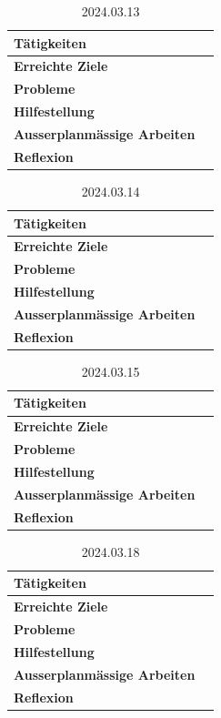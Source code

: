 \documentclass{report}
\begin{document}
\begin{table}[ht]
\caption{2024.03.13}
\begin{tabularx}{\textwidth}{|X|X|}
 \hline
 \textbf{Tätigkeiten} &   \\
 \hline
 \textbf{Erreichte Ziele} &   \\
  \hline
 \textbf{Probleme} &   \\
 \hline
 \textbf{Hilfestellung} &  \\
 \hline
 \textbf{Ausserplanmässige Arbeiten} &   \\
 \hline
 \textbf{Reflexion} &   \\
\hline
\end{tabularx}

\end{table}

\begin{table}[ht]
\caption{2024.03.14}
\begin{tabularx}{\textwidth}{|X|X|}
 \hline
 \textbf{Tätigkeiten} &   \\
 \hline
 \textbf{Erreichte Ziele} &   \\
  \hline
 \textbf{Probleme} &   \\
 \hline
 \textbf{Hilfestellung} &  \\
 \hline
 \textbf{Ausserplanmässige Arbeiten} &   \\
 \hline
 \textbf{Reflexion} &   \\
\hline
\end{tabularx}

\end{table}

\begin{table}[ht]
\caption{2024.03.15}
\begin{tabularx}{\textwidth}{|X|X|}
 \hline
 \textbf{Tätigkeiten} &   \\
 \hline
 \textbf{Erreichte Ziele} &   \\
  \hline
 \textbf{Probleme} &   \\
 \hline
 \textbf{Hilfestellung} &  \\
 \hline
 \textbf{Ausserplanmässige Arbeiten} &   \\
 \hline
 \textbf{Reflexion} &   \\
\hline
\end{tabularx}

\end{table}

\begin{table}[ht]
\caption{2024.03.18}
\begin{tabularx}{\textwidth}{|X|X|}
 \hline
 \textbf{Tätigkeiten} &   \\
 \hline
 \textbf{Erreichte Ziele} &   \\
  \hline
 \textbf{Probleme} &   \\
 \hline
 \textbf{Hilfestellung} &  \\
 \hline
 \textbf{Ausserplanmässige Arbeiten} &  \\
 \hline
 \textbf{Reflexion} &   \\
\hline
\end{tabularx}

\end{table}
\end{document}
